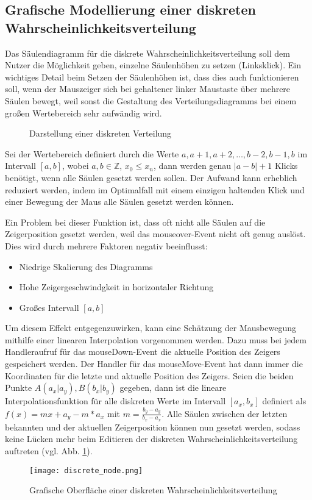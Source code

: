 \subsection{Grafische Modellierung einer diskreten Wahrscheinlichkeitsverteilung}

Das Säulendiagramm für die diskrete Wahrscheinlichkeitsverteilung soll dem Nutzer die Möglichkeit geben, einzelne Säulenhöhen zu setzen (Linksklick). Ein wichtiges Detail beim Setzen der Säulenhöhen ist, dass dies auch funktionieren soll, wenn der Mauszeiger sich bei gehaltener linker Maustaste über mehrere Säulen bewegt, weil sonst die Gestaltung des Verteilungsdiagramms bei einem großen Wertebereich sehr aufwändig wird. 

\begin{figure}[H]
    \center
    \caption{Darstellung einer diskreten Verteilung}
\end{figure}

Sei der Wertebereich definiert durch die Werte $a,a+1,a+2,\dots,b-2,b-1,b$ im Intervall $[a,b]$, wobei $a,b \in\mathbb{Z}$, $x_0 \le x_n$, dann werden genau $|a-b|+1$ Klicks benötigt, wenn alle Säulen gesetzt werden sollen. Der Aufwand kann erheblich reduziert werden, indem im Optimalfall mit einem einzigen haltenden Klick und einer Bewegung der Maus alle Säulen gesetzt werden können.

Ein Problem bei dieser Funktion ist, dass oft nicht alle Säulen auf die Zeigerposition gesetzt werden, weil das mouseover-Event nicht oft genug auslöst. Dies wird durch mehrere Faktoren negativ beeinflusst:
\begin{itemize}
    \item Niedrige Skalierung des Diagramms
    \item Hohe Zeigergeschwindgkeit in horizontaler Richtung
    \item Großes Intervall $[a,b]$
 \end{itemize}

Um diesem Effekt entgegenzuwirken, kann eine Schätzung der Mausbewegung mithilfe einer linearen Interpolation vorgenommen werden. Dazu muss bei jedem Handleraufruf für das mouseDown-Event die aktuelle Position des Zeigers gespeichert werden. Der Handler für das mouseMove-Event hat dann immer die Koordinaten für die letzte und aktuelle Position des Zeigers. Seien die beiden Punkte $A(a_x|a_y), B(b_x|b_y)$ gegeben, dann ist die lineare Interpolationsfunktion für alle diskreten Werte im Intervall $[a_x,b_x]$ definiert als $f(x)=mx+a_y-m*a_x$ mit $m=\frac{b_y-a_y}{b_x-a_x}$. Alle Säulen zwischen der letzten bekannten und der aktuellen Zeigerposition können nun gesetzt werden, sodass keine Lücken mehr beim Editieren der diskreten Wahrscheinlichkeitsverteilung auftreten (vgl. Abb. \ref{fig:discretenode}).

\begin{figure}[H]
    \centering
    \texttt{[image: discrete\_node.png]}
    \caption{Grafische Oberfläche einer diskreten Wahrscheinlichkeitsverteilung}
    \label{fig:discretenode}
\end{figure}